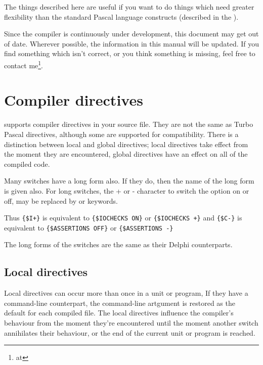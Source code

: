 The things described here are useful if you want to do things which need
greater flexibility than the standard Pascal language constructs
(described in the ).

Since the compiler is continuously under development, this document may get
out of date. Wherever possible, the information in this manual will be
updated. If you find something which isn't correct, or you think something
 is missing, feel free to contact me\footnote{at
}.

\chapter{Compiler directives}
\label{ch:CompSwitch}

\fpc supports compiler directives in your source file. They are not the same
as Turbo Pascal directives, although some are supported for compatibility.
There is a distinction between local and global directives; local directives
take effect from the moment they are encountered, global directives have an
effect on all of the compiled code.

Many switches have a long form also. If they do, then the name of the
long form is given also. For long switches, the + or - character to switch
the option on or off, may be replaced by  or  keywords.

Thus \verb|{$I+}| is equivalent to \verb|{$IOCHECKS ON}| or
\verb|{$IOCHECKS +}| and
\verb|{$C-}| is equivalent to \verb|{$ASSERTIONS OFF}| or
\verb|{$ASSERTIONS -}|

The long forms of the switches are the same as their Delphi
counterparts.

\section{Local directives}
\label{se:LocalSwitch}
Local directives can occur more than once in a unit or program,
If they have a command-line counterpart, the command-line artgument is
restored as the default for each compiled file. The local directives
influence the compiler's behaviour from the moment they're encountered
until the moment another switch annihilates their behaviour, or the end
of the current unit or program is reached.

